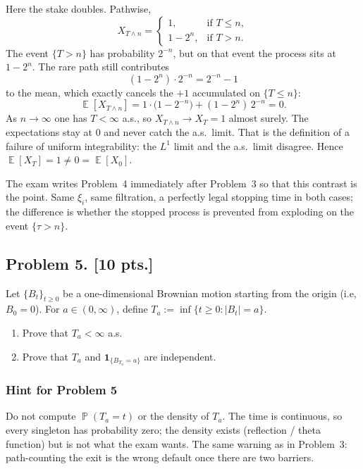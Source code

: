 \documentclass[11pt,a4paper]{article}
\DeclareMathOperator{\E}{\mathbb{E}}
\DeclareMathOperator{\Pbb}{\mathbb{P}}
\begin{document}
\begin{remark}
Here the stake doubles. Pathwise,
\[
X_{T\wedge n}
=
\begin{cases}
1,
&
\text{if }T\le n,\\
1-2^{n},
&
\text{if }T>n.
\end{cases}
\]
The event \( \{T>n\} \) has probability \( 2^{-n} \), but on that event the process sits at \( 1-2^{n} \). The rare path still contributes
\[
(1-2^{n})\cdot 2^{-n}
=
2^{-n}-1
\]
to the mean, which exactly cancels the \( +1 \) accumulated on \( \{T\le n\} \):
\[
\E[X_{T\wedge n}]
=
1\cdot\bigl(1-2^{-n}\bigr)+(1-2^{n})\,2^{-n}
=
0.
\]
As \( n\to\infty \) one has \( T<\infty \) a.s., so \( X_{T\wedge n}\to X_T=1 \) almost surely. The expectations stay at \( 0 \) and never catch the a.s.\ limit. That is the definition of a failure of uniform integrability: the \( L^{1} \) limit and the a.s.\ limit disagree. Hence \( \E[X_T]=1\neq 0=\E[X_0] \).

The exam writes Problem~4 immediately after Problem~3 so that this contrast is the point. Same \( \xi_i \), same filtration, a perfectly legal stopping time in both cases; the difference is whether the stopped process is prevented from exploding on the event \( \{\tau>n\} \).
\end{remark}

\subsection{Problem 5. [10 pts.]}
Let \( \{B_t\}_{t \ge 0} \) be a one-dimensional Brownian motion starting from the origin (i.e, \( B_0 = 0 \)). For \( a \in (0, \infty) \), define \( T_a := \inf\{t \ge 0 : |B_t| = a\} \).
\begin{enumerate}[label=(\arabic*)]
    \item Prove that \( T_a < \infty \) a.s.
    \item Prove that \( T_a \) and \( \mathbf{1}_{\{B_{T_a} = a\}} \) are independent.
\end{enumerate}

\setcounter{section}{5}

\subsubsection{Hint for Problem 5}

Do not compute \( \Pbb(T_a=t) \) or the density of \( T_a \). The time is continuous, so every singleton has probability zero; the density exists (reflection / theta function) but is not what the exam wants. The same warning as in Problem~3: path-counting the exit is the wrong default once there are two barriers.
\end{document}
